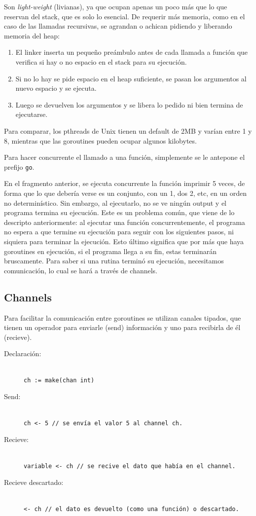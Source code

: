 \documentclass{article}
\begin{document}
Son \emph{light-weight} (livianas), ya que ocupan apenas un poco más que lo que reservan del stack, que es solo lo esencial. De requerir más memoria, como en el caso de las llamadas recursivas, se agrandan o achican pidiendo y liberando memoria del heap:

\begin{enumerate}
\item El linker inserta un pequeño preámbulo antes de cada llamada a función que verifica si hay o no espacio en el stack para su ejecución.
\item Si no lo hay se pide espacio en el heap suficiente, se pasan los argumentos al nuevo espacio y se ejecuta.
\item Luego se devuelven los argumentos y se libera lo pedido ni bien termina de ejecutarse.
\end{enumerate}
Para comparar, los pthreads de Unix tienen un default de 2MB y varían entre 1 y 8, mientras que las goroutines pueden ocupar algunos kilobytes.

Para hacer concurrente el llamado a una función, simplemente se le antepone el prefijo \lstinline|go|.



En el fragmento anterior, se ejecuta concurrente la función imprimir 5 veces, de forma que lo que debería verse es un conjunto, con un 1, dos 2, etc, en un orden no determinístico. Sin embargo, al ejecutarlo, no se ve ningún output y el programa termina su ejecución. Este es un problema común, que viene de lo descripto anteriormente: al ejecutar una función concurrentemente, el programa no espera a que termine su ejecución para seguir con los siguientes pasos, ni siquiera para terminar la ejecución. Esto último significa que por más que haya goroutines en ejecución, si el programa llega a su fin, estas terminarán bruscamente. Para saber si una rutina terminó su ejecución, necesitamos comunicación, lo cual se hará a través de channels.

\subsection{Channels}
Para facilitar la comunicación entre goroutines se utilizan canales tipados, que tienen un operador para enviarle (send) información y uno para recibirla de él (recieve).

\begin{description}
\item[Declaración:] \hfill \\
	\lstinline|ch := make(chan int)|
\item[Send:] \hfill \\
	\lstinline|ch <- 5 // se envía el valor 5 al channel ch.|
\item[Recieve:] \hfill \\
	\lstinline|variable <- ch // se recive el dato que había en el channel.|
\item[Recieve descartado:] \hfill \\
	\lstinline|<- ch // el dato es devuelto (como una función) o descartado.|
\end{description}
\end{document}

